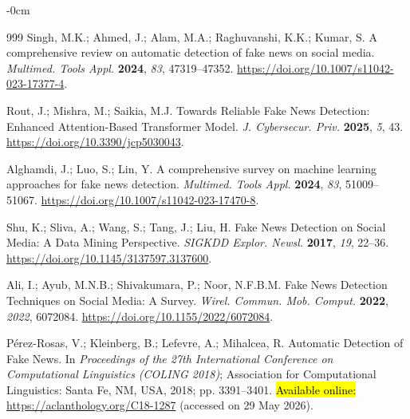 \documentclass[informatics,article,accept,pdftex,moreauthors]{Definitions/mdpi}
\begin{document}
\begin{adjustwidth}{-\extralength}{0cm}
\begin{thebibliography}{999}
Singh, M.K.; Ahmed, J.; Alam, M.A.; Raghuvanshi, K.K.; Kumar, S. A comprehensive review on automatic detection of fake news on social media. \textit{Multimed. Tools Appl.} \textbf{2024}, \textit{83}, 47319--47352. \href{https://doi.org/10.1007/s11042-023-17377-4}{https://doi.org/10.1007/s11042-023-17377-4}.
 
Rout, J.; Mishra, M.; Saikia, M.J. Towards Reliable Fake News Detection: Enhanced Attention-Based Transformer Model. \linebreak  \textit{J. Cybersecur. Priv.} \textbf{2025}, \textit{5}, 43. \href{https://doi.org/10.3390/jcp5030043}{https://doi.org/10.3390/jcp5030043}.
 
Alghamdi, J.; Luo, S.; Lin, Y. A comprehensive survey on machine learning approaches for fake news detection. \textit{Multimed. Tools Appl.} \textbf{2024}, \textit{83}, 51009--51067. \href{https://doi.org/10.1007/s11042-023-17470-8}{https://doi.org/10.1007/s11042-023-17470-8}.
 
Shu, K.; Sliva, A.; Wang, S.; Tang, J.; Liu, H. Fake News Detection on Social Media: A Data Mining Perspective. \textit{SIGKDD Explor. Newsl.} \textbf{2017}, \textit{19}, 22--36. \href{https://doi.org/10.1145/3137597.3137600}{https://doi.org/10.1145/3137597.3137600}.
 
Ali, I.; Ayub, M.N.B.; Shivakumara, P.; Noor, N.F.B.M. Fake News Detection Techniques on Social Media: A Survey. \textit{Wirel. Commun. Mob. Comput.} \textbf{2022}, \textit{2022}, 6072084. \href{https://doi.org/10.1155/2022/6072084}{https://doi.org/10.1155/2022/6072084}.
 
Pérez-Rosas, V.; Kleinberg, B.; Lefevre, A.; Mihalcea, R. Automatic Detection of Fake News. In \emph{Proceedings of the 27th International Conference on Computational Linguistics (COLING 2018)}; Association for Computational Linguistics: Santa Fe, NM, USA, 2018; \linebreak  pp. 3391--3401. \hl{Available online: } %
 \href{https://aclanthology.org/C18-1287}{https://aclanthology.org/C18-1287} (accessed on 29 May 2026).
 

\end{thebibliography}
\end{adjustwidth}
\end{document}
